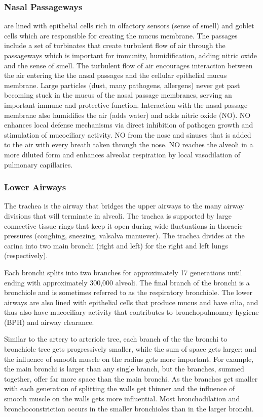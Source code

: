 \subsubsection{Nasal Passageways} are lined with epithelial cells rich in olfactory sensors (sense of smell) and goblet cells which are responsible for creating the mucus membrane. The passages include a set of turbinates that create turbulent flow of air through the passageways which is important for immunity, humidification, adding nitric oxide and the sense of smell. The turbulent flow of air encourages interaction between the air entering the the nasal passages and the cellular epithelial mucus membrane. Large particles (dust, many pathogens, allergens) never get past becoming stuck in the mucus of the nasal passage membranes, serving an important immune and protective function. Interaction with the nasal passage membrane also humidifies the air (adds water) and adds nitric oxide (NO). NO enhances local defense mechanisms via direct inhibition of pathogen growth and stimulation of mucociliary activity. NO from the nose and sinuses that is added to the air with every breath taken through the nose. NO reaches the alveoli in a more diluted form and enhances alveolar respiration by local vasodilation of pulmonary capillaries.

\subsubsection{Lower Airways}
The trachea is the airway that bridges the upper airways to the many airway divisions that will terminate in alveoli. The trachea is supported by large connective tissue rings that keep it open during wide fluctuations in thoracic pressures (coughing, sneezing, valsalva manuever). The trachea divides at the carina into two main bronchi (right and left) for the right and left lungs (respectively). 

Each bronchi splits into two branches for approximately 17 generations until ending with approximately 300,000 alveoli. The final branch of the bronchi is a bronchiole and is sometimes referred to as the respiratory bronchiole. The lower airways are also lined with epithelial cells that produce mucus and have cilia, and thus also have mucociliary activity that contributes to bronchopulmonary hygiene (BPH) and airway clearance. 

Similar to the artery to arteriole tree, each branch of the the bronchi to bronchiole tree gets progressively smaller, while the sum of space gets larger; and the influence of smooth muscle on the radius gets more important. For example, the main bronchi is larger than any single branch, but the branches, summed together, offer far more space than the main bronchi. As the branches get smaller with each generation of splitting the walls get thinner and the influence of smooth muscle on the walls gets more influential. Most bronchodilation and bronchoconstriction occurs in the smaller bronchioles than in the larger bronchi.

